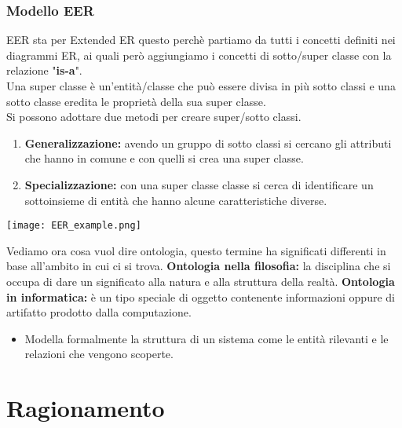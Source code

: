 \documentclass[../main.tex]{subfiles}
\begin{document}
   \subsection{Modello EER}
   EER sta per Extended ER questo perchè partiamo da tutti i concetti definiti nei diagrammi ER, ai quali però aggiungiamo i concetti di sotto/super classe con la relazione "\textbf{is-a}".\\
   Una super classe è un'entità/classe che può essere divisa in più sotto classi e una sotto classe eredita le proprietà della sua super classe.\\
   Si possono adottare due metodi per creare super/sotto classi.
   \begin{enumerate}
      \item \textbf{Generalizzazione:} avendo un gruppo di sotto classi si cercano gli attributi che hanno in comune e con quelli si crea una super classe.
      \item \textbf{Specializzazione:} con una super classe classe si cerca di identificare un sottoinsieme di entità che hanno alcune caratteristiche diverse.
   \end{enumerate}
   \begin{center}
      \texttt{[image: EER\_example.png]}
   \end{center}
   \vspace{2em}
   Vediamo ora cosa vuol dire ontologia, questo termine ha significati differenti in base all'ambito in cui ci si trova.
   \spazio
   \textbf{Ontologia nella filosofia:} la disciplina che si occupa di dare un significato alla natura e alla struttura della realtà.
   \spazio
   \textbf{Ontologia in informatica:} è un tipo speciale di oggetto contenente informazioni oppure di artifatto prodotto dalla computazione.
   \begin{itemize}
      \item Modella formalmente la struttura di un sistema come le entità rilevanti e le relazioni che vengono scoperte.
   \end{itemize}

   \chapter{Ragionamento}
\end{document}
